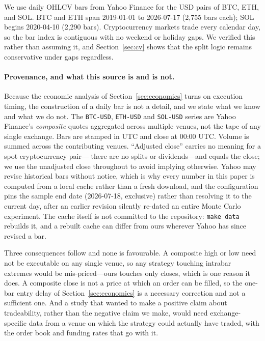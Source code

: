 \documentclass{article}
\theoremstyle{plain}
\theoremstyle{definition}
\begin{document}
We use daily OHLCV bars from Yahoo Finance for the USD pairs of BTC, ETH, and SOL. BTC and
ETH span 2019-01-01 to 2026-07-17 (2{,}755 bars each); SOL begins 2020-04-10 (2{,}290 bars).
Cryptocurrency markets trade every calendar day, so the bar index is contiguous with no
weekend or holiday gaps. We verified this rather than assuming it, and Section~\ref{sec:cv}
shows that the split logic remains conservative under gaps regardless.

\paragraph{Provenance, and what this source is and is not.}
Because the economic analysis of Section~\ref{sec:economics} turns on execution timing, the
construction of a daily bar is not a detail, and we state what we know and what we do not.
The \texttt{BTC-USD}, \texttt{ETH-USD} and \texttt{SOL-USD} series are Yahoo Finance's
\emph{composite} quotes aggregated across multiple venues, not the tape of any single
exchange. Bars are stamped in UTC and close at 00:00 UTC. Volume is summed across the
contributing venues. ``Adjusted close'' carries no meaning for a spot cryptocurrency pair---
there are no splits or dividends---and equals the close; we use the unadjusted close
throughout to avoid implying otherwise. Yahoo may revise historical bars without notice,
which is why every number in this paper is computed from a local cache rather than a fresh
download, and the configuration pins the sample end date (2026-07-18, exclusive) rather than
resolving it to the current day, after an earlier revision silently re-dated an entire Monte
Carlo experiment. The cache itself is not committed to the repository: \texttt{make data}
rebuilds it, and a rebuilt cache can differ from ours wherever Yahoo has since revised a bar.

Three consequences follow and none is favourable. A composite high or low need not be
executable on any single venue, so any strategy touching intrabar extremes would be
mis-priced---ours touches only closes, which is one reason it does. A composite close is not
a price at which an order can be filled, so the one-bar entry delay of
Section~\ref{sec:economics} is a necessary correction and not a sufficient one. And a study
that wanted to make a positive claim about tradeability, rather than the negative claim we
make, would need exchange-specific data from a venue on which the strategy could actually
have traded, with the order book and funding rates that go with it.
\end{document}
